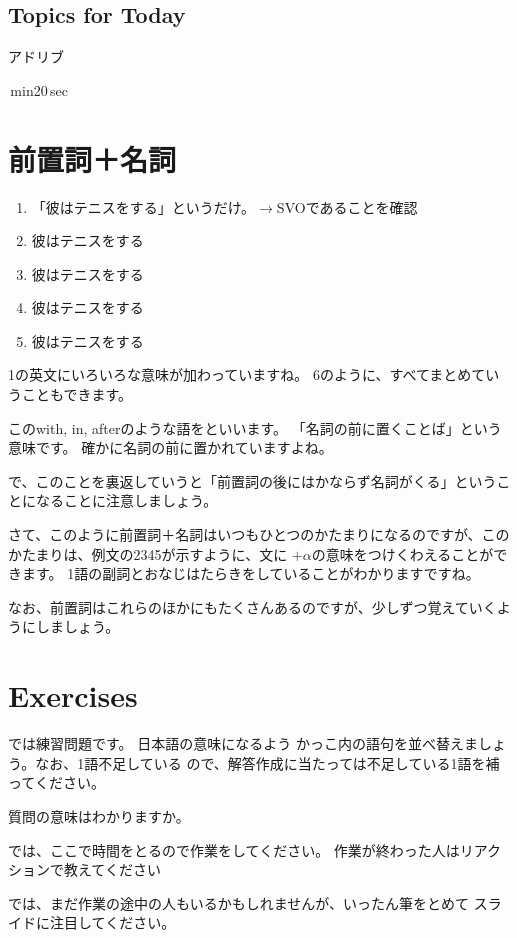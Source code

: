 \documentclass[book,jafontscale=0.9247]{jlreq}
\newcommand{\mySagyo}{%
\par%
\bigskip
では、ここで時間をとるので作業をしてください。
作業が終わった人はリアクションで教えてください\par%
\begin{minipage}[t]{.98\textwidth}
\mbox{}\hrulefill\mbox{}\par%
\mbox{}\hfill{}\raisebox{-.5\height}{作業}\hfill\mbox{}\par%
\mbox{}\hrulefill\mbox{}
\end{minipage}%
\par%
\bigskip%
では、まだ作業の途中の人もいるかもしれませんが、いったん筆をとめて
スライドに注目してください。%
\par%
\bigskip
}
\begin{document}
\subsection{Topics for Today}
アドリブ

\,min20\,sec

\section{前置詞＋名詞}

\begin{enumerate}
 \item 「彼はテニスをする」というだけ。$\rightarrow$SVOであることを確認
 \item 彼はテニスをする
 \item 彼はテニスをする
 \item 彼はテニスをする
 \item 彼はテニスをする
\end{enumerate}

1の英文にいろいろな意味が加わっていますね。
6のように、すべてまとめていうこともできます。

このwith, in, afterのような語をといいます。
「名詞の前に置くことば」という意味です。
確かに名詞の前に置かれていますよね。

で、このことを裏返していうと「前置詞の後にはかならず名詞がくる」ということになることに注意しましょう。

さて、このように\hbox{前置詞＋名詞}はいつもひとつのかたまりになるのですが、このかたまりは、例文の2345が示すように、文に
$+\alpha$の意味をつけくわえることができます。
1語の副詞とおなじはたらきをしていることがわかりますですね。

なお、前置詞はこれらのほかにもたくさんあるのですが、少しずつ覚えていくようにしましょう。

\section{Exercises}

では練習問題です。
日本語の意味になるよう かっこ内の語句を並べ替えましょう。なお、1語不足している
ので、解答作成に当たっては不足している1語を補ってください。

質問の意味はわかりますか。

\mySagyo
\end{document}

